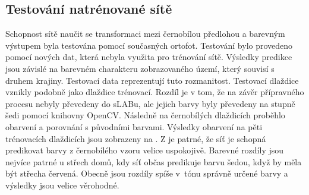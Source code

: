 \subsection{Testování natrénované sítě}

Schopnost sítě naučit se transformaci mezi černobílou předlohou a barevným výstupem byla testována pomocí současných ortofot. Testování bylo provedeno pomocí nových dat, která nebyla využita pro trénování sítě. Výsledky predikce jsou závislé na barevném charakteru zobrazovaného území, který souvisí s druhem krajiny. Testovací data reprezentují tuto rozmanitost. Testovací dlaždice vznikly podobně jako dlaždice trénovací. Rozdíl je v tom, že na závěr přípravného procesu nebyly převedeny do sLABu, ale jejich barvy byly převedeny na stupně šedi pomocí knihovny OpenCV. Následně na černobílých dlaždicích proběhlo obarvení a porovnání s původními barvami. Výsledky obarvení na pěti trénovacích dlaždicích jsou zobrazeny na . Z  je patrné, že síť je schopná predikovat barvy z černobílého vzoru velice uspokojivě. Barevné rozdíly jsou nejvíce patrné u střech domů, kdy síť občas predikuje barvu šedou, když by měla být střecha červená. Obecně jsou rozdíly spíše v~tónu správně určené barvy a výsledky jsou velice věrohodné.

